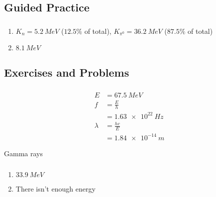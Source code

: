 \documentclass{article}
\begin{document}
\subsection{Guided Practice}

\subsubsection{}

\begin{enumerate}
  \item $K_n = \qty{5.2}{MeV}$ ($12.5\%$ of total), $K_{\pi^0} = \qty{36.2}{MeV}$ ($87.5\%$ of total)

  \item $\qty{8.1}{MeV}$
\end{enumerate}

\subsection{Exercises and Problems}

\subsubsection{}

\begin{align*}
  E       & = \qty{67.5}{MeV}   \\
  f       & = \frac{E}{h}       \\
          & = \qty{1.63e22}{Hz} \\
  \lambda & = \frac{h c}{E}     \\
          & = \qty{1.84e-14}{m}
\end{align*}

Gamma rays

\setcounter{subsubsection}{2}
\subsubsection{}

\begin{enumerate}
  \item $\qty{33.9}{MeV}$

  \item There isn't enough energy
\end{enumerate}

\setcounter{subsubsection}{4}
\subsubsection{}
\end{document}
